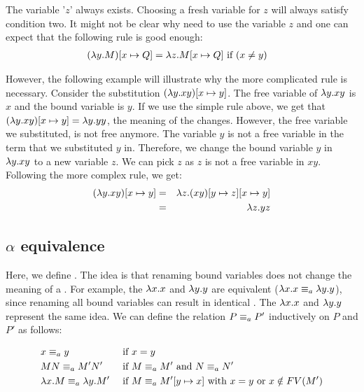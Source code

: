 The variable '$z$' always exists. Choosing a fresh variable for $z$ will always satisfy condition two.
It might not be clear why need to use the variable $z$ and one can expect that the following rule is good enough:
\begin{align*}
	(\lambda {y}.{M}) [{x}\mapsto{Q}] &= \lambda {z}.{M [{x}\mapsto{Q}]} \text{ if } (x \neq y)
\end{align*}

However, the following example will illustrate why the more complicated rule is necessary.
Consider the substitution $(\lambda {y}.{xy})[{x}\mapsto{y}]$. The free variable of \lterm $\lambda {y}.{xy}$ is $x$ and the bound variable is $y$.
If we use the simple rule above, we get that $(\lambda {y}.{xy})[{x}\mapsto{y}] = \lambda {y}.{yy}$, the meaning of the \lterm changes. 
However, the free variable we substituted, is not free anymore. The variable $y$ is not a free variable in the term that we substituted $y$ in.
Therefore, we change the bound variable $y$ in $\lambda {y}.{xy}$ to a new variable $z$. We can pick $z$ as $z$ is not a free variable in $xy$.
Following the more complex rule, we get: 
\begin{eqnarray*}
	(\lambda {y}.{xy})[{x}\mapsto{y}] &=& \lambda {z}.{(xy)[{y}\mapsto{z}][{x}\mapsto{y}]} \\
	&=& \lambda {z}.{yz}
\end{eqnarray*}

\subsection{\texorpdfstring{\boldmath${\alpha}$ equivalence}{Alpha equivalence}}
Here, we define \aeq. The idea is that renaming bound variables does not change the meaning of a \lterm.
For example, the \lterms $\lambda {x}.{x}$ and $\lambda {y}.{y}$ are equivalent ($\lambda {x}.{x} \equiv_a \lambda {y}.{y}$), since renaming all bound variables can result in identical \lterms.
The \lterms $\lambda {x}.{x}$ and $\lambda {y}.{y}$ represent the same idea.
We can define the relation $P \equiv_a P'$ inductively on $P$ and $P'$ as follows:

\[
\begin{aligned}
	& x \equiv_a y                      & &  \text{ if } x = y \\
	& MN \equiv_a M'N'                  & & \text{ if } M \equiv_a M' \text{ and } N \equiv_a N' \\
	& \lambda {x}.{M} \equiv_a \lambda {y}.{M'} & & \text{ if } M \equiv_a M'[{y}\mapsto{x}] \text{ with } x = y \text{ or } x \notin FV(M') \\
\end{aligned}
\]

